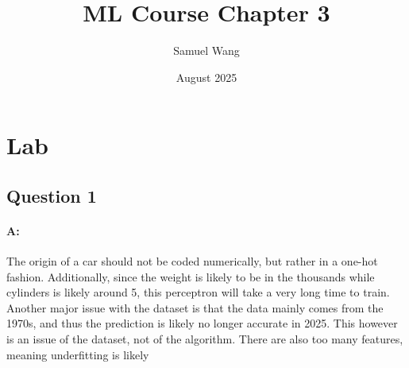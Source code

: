 \documentclass{article}
\title{ML Course Chapter 3}
\author{Samuel Wang}
\date{August 2025}
\begin{document}
\maketitle

\section{Lab}

\subsection{Question 1}

\paragraph{A: } The origin of a car should not be coded numerically, but rather in a one-hot fashion. Additionally, since the weight is likely to be in the thousands while cylinders is likely around 5, this perceptron will take a very long time to train. Another major issue with the dataset is that the data mainly comes from the 1970s, and thus the prediction is likely no longer accurate in 2025. This however is an issue of the dataset, not of the algorithm. There are also too many features, meaning underfitting is likely
\end{document}
